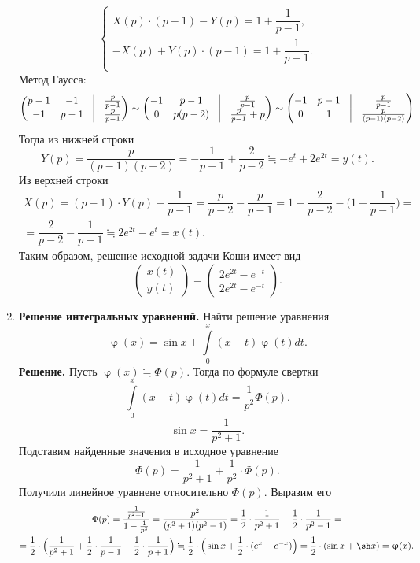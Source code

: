 \documentclass[a4paper, 12pt]{article}
\newcommand{\FI}{\Phi}
\renewcommand{\varphi}{\upvarphi}
\begin{document}
\begin{enumerate}
		$$\begin{cases}
			X(p)\cdot (p-1) - Y(p)= 1 + \dfrac{1}{p -1},\\
			- X(p) + Y(p)\cdot (p-1) = 1 + \dfrac{1}{p -1}.\\
		\end{cases}$$
		Метод Гаусса: $$\begin{pmatrix}
			p - 1 & -1 & \vline & \frac{p}{p-1}\\
			-1 & p-1 & \vline & \frac{p}{p-1}
		\end{pmatrix} \sim \begin{pmatrix}
		-1 & p-1 & \vline & \frac{p}{p-1}\\
		0 & p(p-2) & \vline &  \frac{p}{p-1} + p
		\end{pmatrix} \sim  \begin{pmatrix}
		-1 & p-1 & \vline & \frac{p}{p-1}\\
		0 & 1 & \vline &  \frac{p}{(p-1)(p-2)}
		\end{pmatrix}$$
		Тогда из нижней строки $$Y(p) = \dfrac{p}{(p-1)(p-2)} = -\dfrac{1}{p-1} + \dfrac{2}{p - 2} \fallingdotseq -e^t + 2e^{2t} = y(t).$$
		Из верхней строки \begin{multline*}
			X(p) = (p-1)\cdot Y(p) - \dfrac{1}{p-1} = \dfrac{p}{p-2} - \dfrac{p}{p-1} = 1 + \dfrac{2}{p-2} - \Big(1 + \dfrac{1}{p-1}\Big)=\\ =\dfrac{2}{p-2}-\dfrac{1}{p-1} \fallingdotseq 2e^{2t}-e^t =x(t).
		\end{multline*}
		Таким образом, решение исходной задачи Коши имеет вид $$\begin{pmatrix}
			x(t) \\ y(t)
		\end{pmatrix} = \begin{pmatrix}
		2e^{2t} - e^{-t}\\2e^{2t} - e^{-t}
		\end{pmatrix}.	$$
		\item \textbf{Решение интегральных уравнений.}
		Найти решение уравнения $$\varphi(x) = \sin x + \int\limits_0^x(x-t)\varphi(t)dt.$$
		\textbf{Решение.} Пусть $\varphi(x) \fallingdotseq \FI(p)$. Тогда по формуле свертки
		$$\int\limits_0^x(x-t)\varphi(t)dt = \dfrac{1}{p^2}\FI(p).$$
		$$\sin x = \dfrac{1}{p^2 + 1}.$$
		Подставим найденные значения в исходное уравнение $$\FI(p) = \dfrac{1}{p^2 + 1} + \dfrac{1}{p^2}\cdot \FI(p).$$
		Получили линейное уравнене относительно $\FI(p)$. Выразим его
		\begin{multline*}
			\FI(p) = \dfrac{\frac{1}{p^2+1}}{1-\frac{1}{p^2}} = \dfrac{p^2}{(p^2 + 1)(p^2 - 1)} = \dfrac{1}{2}\cdot \dfrac{1}{p^2 + 1} + \dfrac{1}{2}\cdot \dfrac{1}{p^2 - 1} =\\= \dfrac{1}{2}\cdot \Big(\dfrac{1}{p^2 + 1} +  \dfrac{1}{2}\cdot \dfrac{1}{p -1} -  \dfrac{1}{2}\cdot \dfrac{1}{p+1} \Big)\fallingdotseq \dfrac{1}{2}\cdot \Big( \sin x + \dfrac{1}{2}\cdot (e^x - e^{-x})\Big) = \dfrac{1}{2}\cdot (\sin x + \sh x) = \varphi(x).

\end{multline*}
\end{enumerate}
\end{document}
